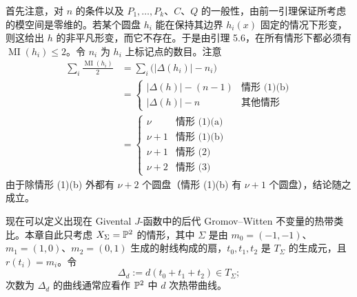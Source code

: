 首先注意，对 $n$ 的条件以及 $P_1,\ldots,P_k$、$C$、$Q$ 的一般性，由前一引理保证所考虑的模空间是零维的。若某个圆盘 $h_i$ 能在保持其边界 $h_i(x)$ 固定的情况下形变，则这给出 $h$ 的非平凡形变，而它不存在。于是由引理 5.6，在所有情形下都必须有 $\operatorname{MI}(h_i)\le2$。令 $n_i$ 为 $h_i$ 上标记点的数目。注意
\[
  \begin{aligned}
    \sum_i\frac{\operatorname{MI}(h_i)}{2}
    &=\sum_i\bigl(|\Delta(h_i)|-n_i\bigr)\\
    &=\begin{cases}
      |\Delta(h)|-(n-1) & \text{情形 (1)(b)}\\
      |\Delta(h)|-n & \text{其他情形}
    \end{cases}\\
    &=\begin{cases}
      \nu & \text{情形 (1)(a)}\\
      \nu+1 & \text{情形 (1)(b)}\\
      \nu+1 & \text{情形 (2)}\\
      \nu+2 & \text{情形 (3)}
    \end{cases}
  \end{aligned}
\]
由于除情形 (1)(b) 外都有 $\nu+2$ 个圆盘（情形 (1)(b) 有 $\nu+1$ 个圆盘），结论随之成立。

现在可以定义出现在 Givental $J$-函数中的后代 Gromov--Witten 不变量的热带类比。本章自此只考虑 $X_\Sigma=\mathbb{P}^2$ 的情形，其中 $\Sigma$ 是由
$m_0=(-1,-1)$、$m_1=(1,0)$、$m_2=(0,1)$ 生成的射线构成的扇，$t_0,t_1,t_2$ 是 $T_\Sigma$ 的生成元，且 $r(t_i)=m_i$。令
\[
  \Delta_d:=d(t_0+t_1+t_2)\in T_\Sigma;
\]
次数为 $\Delta_d$ 的曲线通常应看作 $\mathbb{P}^2$ 中 $d$ 次热带曲线。

